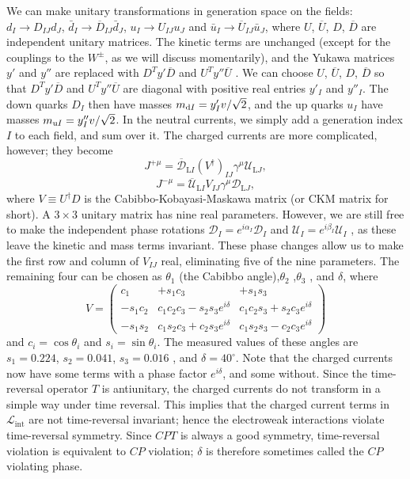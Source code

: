 We can make unitary transformations in generation space on the fields: $d_I \to D_{IJ}d_J $, $\bar{d}_I \to \overline{D}_{IJ}\bar{d}_J$, $u_I \to U_{IJ}u_J $ and $\bar{u}_I \to \overline{U}_{IJ}\bar{u}_J$, where $U$, $\overline{U}$, $D$, $\overline{D}$ are independent unitary matrices. 
The kinetic terms are unchanged (except for the couplings to the $W^{\pm}$, as we will discuss momentarily), and the Yukawa matrices $y'$ and $y''$ are replaced with $D^T y' \overline{D}$  and $U^T y'' \overline{U}$ . We can choose
$U$, $\overline{U}$, $D$, $\overline{D}$ so that $D^T y' \overline{D}$  and $U^T y'' \overline{U}$ are diagonal with positive real entries $y'_I$ and $y''_I$. The down quarks $D_I$ then have masses $m_{{\rm d}I} = {y'_I v}/{\sqrt{2}}$,
and the up quarks $u_I$ have masses $m_{{\rm u}I} = {y''_I v}/{\sqrt{2}}$. 
In the neutral currents, we simply add a generation index $I$ to each field, and sum over it. 
The charged currents are more complicated, however; they become 
\[J^{+\mu} = \overline{\mathcal{D}}_{\mathrm{L}I} (V^{\dagger})_{IJ} \gamma^{\mu} \mathcal{U}_{\mathrm{L}J} ,\]
\[J^{-\mu} = \overline{\mathcal{U}}_{\mathrm{L}I} V_{IJ} \gamma^{\mu} \mathcal{D}_{\mathrm{L}J},\]
where $V \equiv U^{\dagger} D$ is the Cabibbo-Kobayasi-Maskawa matrix (or CKM matrix for short).
A $3 \times 3$ unitary matrix has nine real parameters. However, we are still free to make the independent phase rotations $\mathcal{D}_I = e^{i\alpha_I} \mathcal{D}_I$ and $\mathcal{U}_I = e^{i\beta_I} \mathcal{U}_I$ , as
these leave the kinetic and mass terms invariant. These phase changes allow us to make the first row and column of $V_{IJ}$ real, eliminating five of the nine parameters. The remaining four can be chosen as $\theta_1$ (the Cabibbo angle),$\theta_2$ ,$\theta_3$ , and $\delta$, where
\[V = \begin{pmatrix}
c_1 & +s_1c_3 & +s_1s_3 \\
-s_1c_2 & c_1c_2c_3 - s_2s_3e^{i\delta} & c_1c_2s_3 + s_2c_3e^{i\delta} \\
-s_1s_2 & c_1s_2c_3 + c_2s_3e^{i\delta} & c_1s_2s_3- c_2c_3 e^{i\delta}
\end{pmatrix} \]
and $c_i = \cos\theta_i$ and $s_i = \sin\theta_i$. The measured values of these angles are $s_1=0.224$, $s_2 = 0.041$, $s_3 = 0.016$ , and $\delta = 40^{\circ}$. Note that the charged currents now have some terms with a phase factor $e^{i\delta}$, and some without. 
Since the time-reversal operator $T$ is antiunitary, the charged currents do not transform in a simple way under time reversal. This implies that the charged current terms in $\mathcal{L}_{\mathrm{int}}$ are not time-reversal invariant; hence the electroweak interactions violate time-reversal symmetry.
Since $CPT$ is always a good symmetry, time-reversal violation is equivalent to $CP$ violation; $\delta$ is therefore sometimes called the $CP$ violating phase.

